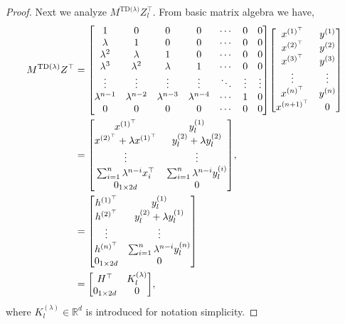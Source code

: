\documentclass{article}
\newcommand{\R}{\mathbb{R}}
\newcommand{\tdlambda}{\text{TD($\lambda$)}}
\begin{document}
\begin{proof}
    Next we analyze $M^\tdlambda  Z_l^{\top}$. From basic matrix algebra we have,
    \begin{align}
        M^\tdlambda Z^\top  &= 
            \mqty[1 & 0 & 0 & 0 & \cdots & 0 & 0\\
            \lambda & 1 & 0 & 0 & \cdots & 0 & 0\\
            \lambda^2 & \lambda & 1 & 0 &\cdots & 0 & 0\\
            \lambda^3 & \lambda^2 & \lambda & 1 & \cdots & 0 & 0\\
            \vdots & \vdots & \vdots & \vdots & \ddots & \vdots & \vdots\\
            \lambda^{n-1} & \lambda^{n-2} & \lambda^{n-3} & \lambda^{n-4} & \cdots & 1 & 0\\
            0 & 0 & 0 & 0 & \cdots & 0 & 0] \mqty[x^{(1)^\top} & y^{(1)}\\
        x^{(2)^\top} & y^{(2)}\\
        x^{(3)^\top} & y^{(3)}\\
        \vdots & \vdots\\
        x^{(n)^\top} & y^{(n)}\\
        x^{(n+1)^\top} & 0
        ] \\
        &= \mqty[ x^{(1)^\top} &  y_l^{(1)}\\
                x^{(2)^\top} + \lambda x^{(1)^\top} & y_l^{(2)} + \lambda y_l^{(2)}\\
                \vdots & \vdots\\
                \sum_{i=1}^{n} \lambda^{n-i} x_i^\top &  \sum_{i=1}^{n} \lambda^{n-i} y_l^{(i)}\\
                0_{1\times 2d} & 0
                ],\\
        &=  \mqty[ h^{(1)^\top} &  y_l^{(1)}\\
            h^{(2)^\top} & y_l^{(2)} + \lambda y_l^{(1)}\\
            \vdots & \vdots\\
            h^{(n)^\top} &  \sum_{i=1}^{n} \lambda^{n-i} y_l^{(n)}\\
            0_{1\times 2d} & 0
            ]\\
        &= \mqty[H^\top & K_l^{(\lambda)} \\ 0_{1\times 2d} & 0], \label{eq: block Mtd ZT}
    \end{align}
    where $K_l^{(\lambda)} \in \R^d$ is introduced for notation simplicity.
    


\end{proof}
\end{document}
